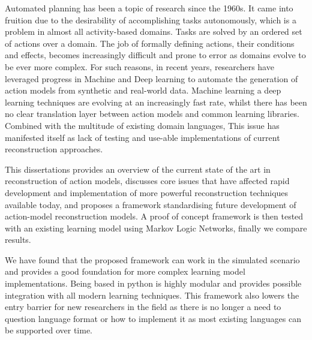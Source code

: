 
Automated planning has been a topic of research since the 1960s. It came into fruition due to the desirability of accomplishing tasks autonomously, which is a problem in almost all activity-based domains. Tasks are solved by an ordered set of actions over a domain. The job of formally defining actions, their conditions and effects, becomes increasingly difficult and prone to error as domains evolve to be ever more complex. For such reasons, in recent years, researchers have leveraged progress in Machine and Deep learning to automate the generation of action models from synthetic and real-world data. Machine learning a deep learning techniques are evolving at an increasingly fast rate, whilst there has been no clear translation layer between action models and common learning libraries. Combined with the multitude of existing domain languages, This issue has manifested itself as lack of testing and use-able implementations of current reconstruction approaches.

This dissertations provides an overview of the current state of the art in reconstruction of action models, discusses core issues that have affected rapid development and implementation of more powerful reconstruction techniques available today, and proposes a framework standardising future development of  action-model reconstruction models. A proof of concept framework is then tested with an existing learning model using Markov Logic Networks, finally we compare results. 

We have found that the proposed framework can work in the simulated scenario and provides a good foundation for more complex learning model implementations. Being based in python is highly modular and provides possible integration with all modern learning techniques. This framework also lowers the entry barrier for new researchers in the field as there is no longer a need to question language format or how to implement it as most existing languages can be supported over time.









